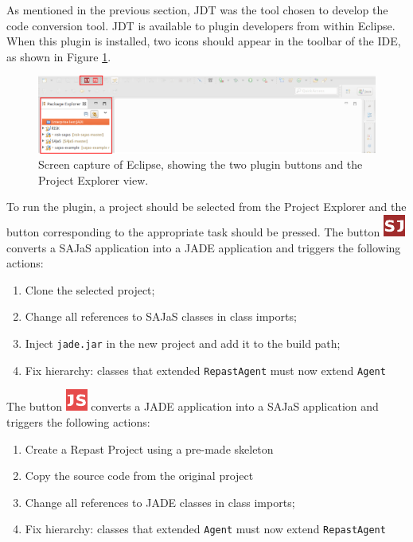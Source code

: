 As mentioned in the previous section, JDT was the tool chosen to develop the code conversion tool. JDT is available to plugin developers from within Eclipse. When this plugin is installed, two icons should appear in the toolbar of the IDE, as shown in Figure \ref{fig:cct_screenshot}.

\begin{figure}[h]
	\centering
	\includegraphics[width=\linewidth]{figures/cct_screenshot.png}
	\caption[Eclipse plugin screen capture]{Screen capture of Eclipse, showing the two plugin buttons and the Project Explorer view.}
	\label{fig:cct_screenshot}
\end{figure}

To run the plugin, a project should be selected from the Project Explorer and the button corresponding to the appropriate task should be pressed. The button \includegraphics[scale=1.0]{figures/sj.pdf} converts a SAJaS application into a JADE application and triggers the following actions:

\begin{samepage}
\begin{enumerate}
  \item Clone the selected project;
  \item Change all references to SAJaS classes in class imports;
  \item Inject \texttt{jade.jar} in the new project and add it to the build path;
  \item Fix hierarchy: classes that extended \texttt{RepastAgent} must now extend \texttt{Agent}
\end{enumerate}
\end{samepage}

The button \includegraphics[scale=1.0]{figures/js.pdf} converts a JADE application into a SAJaS application and triggers the following actions:

\begin{samepage}
\begin{enumerate}
  \item Create a Repast Project using a pre-made skeleton
  \item Copy the source code from the original project
  \item Change all references to JADE classes in class imports;
  \item Fix hierarchy: classes that extended \texttt{Agent} must now extend \texttt{RepastAgent}
\end{enumerate}
\end{samepage}

